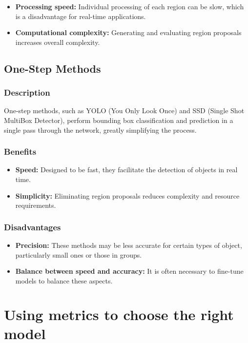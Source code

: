 \documentclass[12pt,oneside]{book} %
\begin{document}
\begin{itemize}
    \item \textbf{Processing speed:} Individual processing of each region can be slow, which is a disadvantage for real-time applications.
    \item \textbf{Computational complexity:} Generating and evaluating region proposals increases overall complexity.
\end{itemize}

\subsection{One-Step Methods}

\subsubsection{Description}
One-step methods, such as YOLO (You Only Look Once) and SSD (Single Shot
MultiBox Detector), perform bounding box classification and prediction in a
single pass through the network, greatly simplifying the process.

\subsubsection{Benefits}

\begin{itemize}
    \item \textbf{Speed:} Designed to be fast, they facilitate the detection of objects in real time.
    \item \textbf{Simplicity:} Eliminating region proposals reduces complexity and resource requirements.
\end{itemize}

\subsubsection{Disadvantages}

\begin{itemize}
    \item \textbf{Precision:} These methods may be less accurate for certain types of object, particularly small ones or those in groups.
    \item \textbf{Balance between speed and accuracy:} It is often necessary to fine-tune models to balance these aspects.
\end{itemize}

\section{Using metrics to choose the right model}
\end{document}

